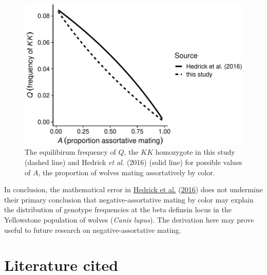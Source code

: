 \documentclass[
]{article}
\begin{document}
\begin{figure}

{\centering \includegraphics{ms_files/figure-latex/fig1-1} 

}

\caption{The equilibirum frequency of $Q$, the $KK$ homozygote in this study (dashed line) and Hedrick \textit{et al.} (2016) (solid line) for possible values of $A$, the proportion of wolves mating assortatively by color.}\label{fig:fig1}
\end{figure}

In conclusion, the mathematical error in \protect\hyperlink{ref-hedrick_negative-assortative_2016}{Hedrick et al.} (\protect\hyperlink{ref-hedrick_negative-assortative_2016}{2016}) does not undermine their primary conclusion that negative-assortative mating by color may explain the distribution of genotype frequencies at the beta definsin locus in the Yellowstone population of wolves (\emph{Canis lupus}). The derivation here may prove useful to future research on negative-assortative mating.

\hypertarget{literature-cited}{%
\section*{Literature cited}\label{literature-cited}}
\end{document}
